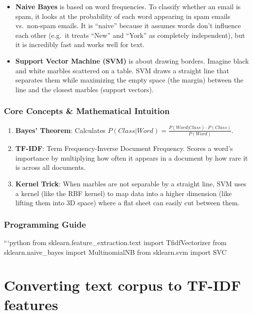 \begin{itemize}
\tightlist
\item
  \textbf{Naive Bayes} is based on word frequencies. To classify whether
  an email is spam, it looks at the probability of each word appearing
  in spam emails vs.~non-spam emails. It is ``naive'' because it assumes
  words don't influence each other (e.g.~it treats ``New'' and ``York''
  as completely independent), but it is incredibly fast and works well
  for text.
\item
  \textbf{Support Vector Machine (SVM)} is about drawing borders.
  Imagine black and white marbles scattered on a table. SVM draws a
  straight line that separates them while maximizing the empty space
  (the margin) between the line and the closest marbles (support
  vectors).
\end{itemize}

\subsubsection{Core Concepts \& Mathematical
Intuition}\label{core-concepts-mathematical-intuition-3}

\begin{enumerate}
\def\labelenumi{\arabic{enumi}.}
\tightlist
\item
  \textbf{Bayes' Theorem}: Calculates
  \(P(Class | Word) = \frac{P(Word | Class) \cdot P(Class)}{P(Word)}\).
\item
  \textbf{TF-IDF}: Term Frequency-Inverse Document Frequency. Scores a
  word's importance by multiplying how often it appears in a document by
  how rare it is across all documents.
\item
  \textbf{Kernel Trick}: When marbles are not separable by a straight
  line, SVM uses a kernel (like the RBF kernel) to map data into a
  higher dimension (like lifting them into 3D space) where a flat sheet
  can easily cut between them.
\end{enumerate}

\subsubsection{Programming Guide}\label{programming-guide-5}

```python from sklearn.feature\_extraction.text import TfidfVectorizer
from sklearn.naive\_bayes import MultinomialNB from sklearn.svm import
SVC

\section{Converting text corpus to TF-IDF
features}\label{converting-text-corpus-to-tf-idf-features}

